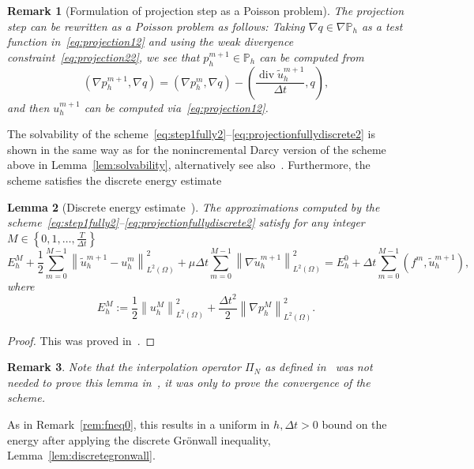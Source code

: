 \documentclass[10pt,letterpaper]{amsart}
\newcommand{\tu}{\widetilde{u}}
\newcommand\norm[1]{\left\lVert#1\right\rVert}
\newcommand{\Grad}{\nabla}
\newcommand{\Div}{\operatorname{div}}
\newcommand{\dom}{\Omega}
\newcommand{\Ph}{\mathbb{P}_h}
\newtheorem{lemma}{Lemma}[section]
\newtheorem{remark}[lemma]{Remark}
\theoremstyle{definition}{\newtheorem{definition}[lemma]{Definition}}
\numberwithin{equation}{section}
\begin{document}
\begin{remark}[Formulation of projection step as a Poisson problem]
	The projection step can be rewritten as a Poisson problem as follows: Taking $\Grad q\in \Grad\Ph$ as a test function in~\eqref{eq:projection12} and using the weak divergence constraint~\eqref{eq:projection22}, we see that $p_h^{m+1}\in \Ph$ can be computed from
	\begin{equation*}
		(\Grad p^{m+1}_h,\Grad q) = (\Grad p^m_h,\Grad q)-\left(\frac{\Div \tu^{m+1}_h}{\Delta t},q\right),
	\end{equation*}
	and then $u_h^{m+1}$ can be computed via~\eqref{eq:projection12}.
	
\end{remark}
The solvability of the scheme~\eqref{eq:step1fully2}--\eqref{eq:projectionfullydiscrete2} is shown in the same way as for the nonincremental Darcy version of the scheme above in Lemma~\ref{lem:solvability}, alternatively see also~\cite[Lemma 2.1]{Eymard2024}. Furthermore, the scheme satisfies the discrete energy estimate
\begin{lemma}[Discrete energy estimate~\cite{Eymard2024}]
	\label{lem:discenergy2}
	The approximations computed by the scheme~\eqref{eq:step1fully2}--\eqref{eq:projectionfullydiscrete2} satisfy for any integer $M\in \left\{0,1,\dots, \frac{T}{\Delta t}\right\}$
	\begin{equation}
		\label{eq:energybalance2}
		E^M_h + \frac12 \sum_{m=0}^{M-1} \norm{\tu_h^{m+1} - u_h^m}_{L^2(\dom)}^2 +\mu\Delta t \sum_{m=0}^{M-1} \norm{\Grad \tu_h^{m+1}}_{L^2(\dom)}^2  = E_h^0 + \Delta t \sum_{m=0}^{M-1} (f^m,\tu_h^{m+1}),
	\end{equation}
	where 
	\begin{equation*}
		E_h^M := \frac12 \norm{u_h^M}_{L^2(\dom)}^2 + \frac{\Delta t^2}{2}\norm{\Grad p_h^{M}}_{L^2(\dom)}^2.
	\end{equation*}
	
\end{lemma}
\begin{proof}
	This was proved in~\cite[Lemma 3.1]{Eymard2024}.
\end{proof}
\begin{remark}
	Note that the interpolation operator $\Pi_N$ as defined in~\cite{Eymard2024} was not needed to prove this lemma in~\cite{Eymard2024}, it was only to prove the convergence of the scheme.
\end{remark}
As in Remark~\ref{rem:fneq0}, this results in a uniform in $h,\Delta t >0$ bound on the energy after applying the discrete Gr\"onwall inequality, Lemma~\ref{lem:discretegronwall}. 
\end{document}
